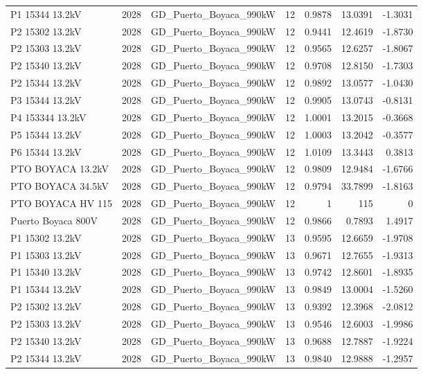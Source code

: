 \documentclass[11pt,a4paper]{article}
\begin{document}
\begin{longtable}{llllrrr}
P1 15344 13.2kV & 2028 & GD\_Puerto\_Boyaca\_990kW & 12 & 0.9878 & 13.0391 & -1.3031 \\
P2 15302 13.2kV & 2028 & GD\_Puerto\_Boyaca\_990kW & 12 & 0.9441 & 12.4619 & -1.8730 \\
P2 15303 13.2kV & 2028 & GD\_Puerto\_Boyaca\_990kW & 12 & 0.9565 & 12.6257 & -1.8067 \\
P2 15340 13.2kV & 2028 & GD\_Puerto\_Boyaca\_990kW & 12 & 0.9708 & 12.8150 & -1.7303 \\
P2 15344 13.2kV & 2028 & GD\_Puerto\_Boyaca\_990kW & 12 & 0.9892 & 13.0577 & -1.0430 \\
P3 15344 13.2kV & 2028 & GD\_Puerto\_Boyaca\_990kW & 12 & 0.9905 & 13.0743 & -0.8131 \\
P4 153344 13.2kV & 2028 & GD\_Puerto\_Boyaca\_990kW & 12 & 1.0001 & 13.2015 & -0.3668 \\
P5 15344 13.2kV & 2028 & GD\_Puerto\_Boyaca\_990kW & 12 & 1.0003 & 13.2042 & -0.3577 \\
P6 15344 13.2kV & 2028 & GD\_Puerto\_Boyaca\_990kW & 12 & 1.0109 & 13.3443 & 0.3813 \\
PTO BOYACA 13.2kV & 2028 & GD\_Puerto\_Boyaca\_990kW & 12 & 0.9809 & 12.9484 & -1.6766 \\
PTO BOYACA 34.5kV & 2028 & GD\_Puerto\_Boyaca\_990kW & 12 & 0.9794 & 33.7899 & -1.8163 \\
PTO BOYACA HV 115 & 2028 & GD\_Puerto\_Boyaca\_990kW & 12 & 1 & 115 & 0 \\
Puerto Boyaca 800V & 2028 & GD\_Puerto\_Boyaca\_990kW & 12 & 0.9866 & 0.7893 & 1.4917 \\
P1 15302 13.2kV & 2028 & GD\_Puerto\_Boyaca\_990kW & 13 & 0.9595 & 12.6659 & -1.9708 \\
P1 15303 13.2kV & 2028 & GD\_Puerto\_Boyaca\_990kW & 13 & 0.9671 & 12.7655 & -1.9313 \\
P1 15340 13.2kV & 2028 & GD\_Puerto\_Boyaca\_990kW & 13 & 0.9742 & 12.8601 & -1.8935 \\
P1 15344 13.2kV & 2028 & GD\_Puerto\_Boyaca\_990kW & 13 & 0.9849 & 13.0004 & -1.5260 \\
P2 15302 13.2kV & 2028 & GD\_Puerto\_Boyaca\_990kW & 13 & 0.9392 & 12.3968 & -2.0812 \\
P2 15303 13.2kV & 2028 & GD\_Puerto\_Boyaca\_990kW & 13 & 0.9546 & 12.6003 & -1.9986 \\
P2 15340 13.2kV & 2028 & GD\_Puerto\_Boyaca\_990kW & 13 & 0.9688 & 12.7887 & -1.9224 \\
P2 15344 13.2kV & 2028 & GD\_Puerto\_Boyaca\_990kW & 13 & 0.9840 & 12.9888 & -1.2957 \\

\end{longtable}
\end{document}
